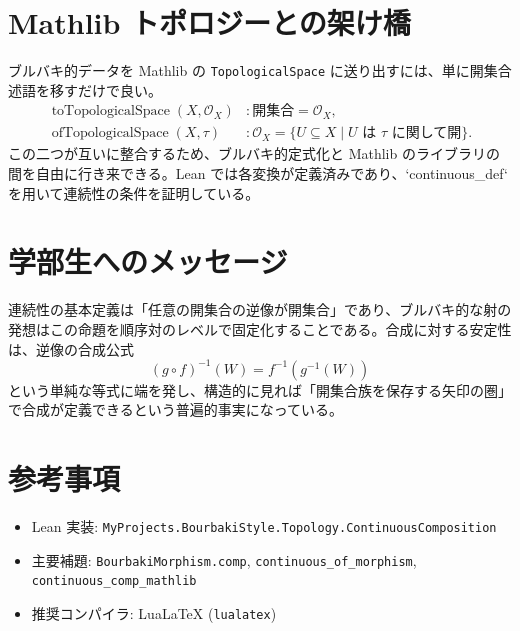 \documentclass[a4paper]{ltjsarticle}
\theoremstyle{definition}
\theoremstyle{plain}
\begin{document}
\section{Mathlib トポロジーとの架け橋}
ブルバキ的データを Mathlib の \texttt{TopologicalSpace} に送り出すには、単に開集合述語を移すだけで良い。
\begin{align*}
\operatorname{toTopologicalSpace}(X,\mathcal{O}_X) &: \text{開集合} = \mathcal{O}_X, \\
\operatorname{ofTopologicalSpace}(X,\tau) &: \mathcal{O}_X = \{U \subseteq X \mid U \text{ は } \tau \text{ に関して開}\}.
\end{align*}
この二つが互いに整合するため、ブルバキ的定式化と Mathlib のライブラリの間を自由に行き来できる。Lean では各変換が定義済みであり、`continuous_def` を用いて連続性の条件を証明している。

\section{学部生へのメッセージ}
連続性の基本定義は「任意の開集合の逆像が開集合」であり、ブルバキ的な射の発想はこの命題を順序対のレベルで固定化することである。合成に対する安定性は、逆像の合成公式
\[
(g \circ f)^{-1}(W) = f^{-1}(g^{-1}(W))
\]
という単純な等式に端を発し、構造的に見れば「開集合族を保存する矢印の圏」で合成が定義できるという普遍的事実になっている。

\section*{参考事項}
\begin{itemize}
  \item Lean 実装: \texttt{MyProjects.BourbakiStyle.Topology.ContinuousComposition}
  \item 主要補題: \texttt{BourbakiMorphism.comp}, \texttt{continuous\_of\_morphism}, \texttt{continuous\_comp\_mathlib}
  \item 推奨コンパイラ: LuaLaTeX (\texttt{lualatex})
\end{itemize}
\end{document}
